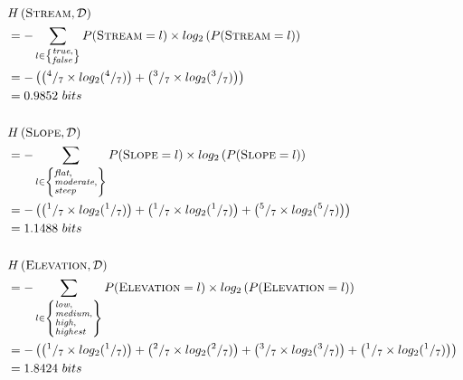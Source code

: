 \documentclass[xcolor={table}]{beamer}
\newcommand{\featN}[1]{\textsc{#1}}
\newcommand{\featL}[1]{\textit{#1}}
\begin{document}
 \begin{frame} 
 \begin{tiny}
\begin{equation*}
	\begin{alignedat}{2}
&H\left(\featN{Stream},\mathcal{D}\right)\\
&= - \sum_{l \in  \left\{ \begin{subarray}{1} \featL{true}, \\ \featL{false} \end{subarray} \right\}} P(\featN{Stream}=l) \times log_2\left(P(\featN{Stream}=l)\right)\\
		&= -\left( \left( ^4/_7 \times log_2( ^4/_7) \right) + \left( ^3/_7  \times log_2(^3/_7)\right) \right)\\
		&= 0.9852~bits \\
		~ & \\
&H\left(\featN{Slope},\mathcal{D}\right)\\
&= - \sum_{l \in  \left\{ \begin{subarray}{1} \featL{flat}, \\ \featL{moderate}, \\ \featL{steep} \end{subarray} \right\}} P(\featN{Slope}=l) \times log_2\left(P(\featN{Slope}=l)\right)\\
		&= -\left( \left( ^1/_7 \times log_2( ^1/_7) \right) + \left( ^1/_7  \times log_2(^1/_7)\right) + \left( ^5/_7  \times log_2(^5/_7)\right) \right)\\
		&= 1.1488~bits \\
				~ & \\
&H\left(\featN{Elevation},\mathcal{D}\right)\\
&= - \sum_{l \in  \left\{ \begin{subarray}{1} \featL{low}, \\ \featL{medium}, \\ \featL{high}, \\ \featL{highest} \end{subarray} \right\}} P(\featN{Elevation}=l) \times log_2\left(P(\featN{Elevation}=l)\right)\\
		&= -\left( \left( ^1/_7 \times log_2( ^1/_7) \right) + \left( ^2/_7  \times log_2(^2/_7)\right) + \left( ^3/_7  \times log_2(^3/_7)\right) + \left( ^1/_7  \times log_2(^1/_7)\right)\right)\\
		&= 1.8424~bits
	\end{alignedat}
\end{equation*}
\end{tiny}
\end{frame} 
\end{document}
